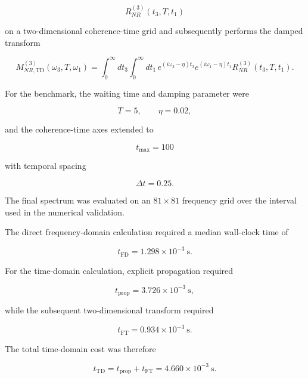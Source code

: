 \documentclass[11pt]{article}
\begin{document}
\begin{equation}
R_{NR}^{(3)}(t_3,T,t_1)
\end{equation}

on a two-dimensional coherence-time grid and subsequently performs the
damped transform

\begin{equation}
M_{NR,\mathrm{TD}}^{(3)}
(\omega_3,T,\omega_1)
=
\int_0^\infty dt_3
\int_0^\infty dt_1\,
e^{(i\omega_3-\eta)t_3}
e^{(i\omega_1-\eta)t_1}
R_{NR}^{(3)}(t_3,T,t_1).
\end{equation}

For the benchmark, the waiting time and damping parameter were

\begin{equation}
T=5,
\qquad
\eta=0.02,
\end{equation}

and the coherence-time axes extended to

\begin{equation}
t_{\max}=100
\end{equation}

with temporal spacing

\begin{equation}
\Delta t=0.25.
\end{equation}

The final spectrum was evaluated on an
$81\times81$ frequency grid over the interval used in the numerical
validation.

The direct frequency-domain calculation required a median wall-clock
time of

\begin{equation}
\boxed{
t_{\mathrm{FD}}
=
1.298\times10^{-3}\ \mathrm{s}.
}
\end{equation}

For the time-domain calculation, explicit propagation required

\begin{equation}
t_{\mathrm{prop}}
=
3.726\times10^{-3}\ \mathrm{s},
\end{equation}

while the subsequent two-dimensional transform required

\begin{equation}
t_{\mathrm{FT}}
=
0.934\times10^{-3}\ \mathrm{s}.
\end{equation}

The total time-domain cost was therefore

\begin{equation}
\boxed{
t_{\mathrm{TD}}
=
t_{\mathrm{prop}}
+
t_{\mathrm{FT}}
=
4.660\times10^{-3}\ \mathrm{s}.
}
\end{equation}
\end{document}
